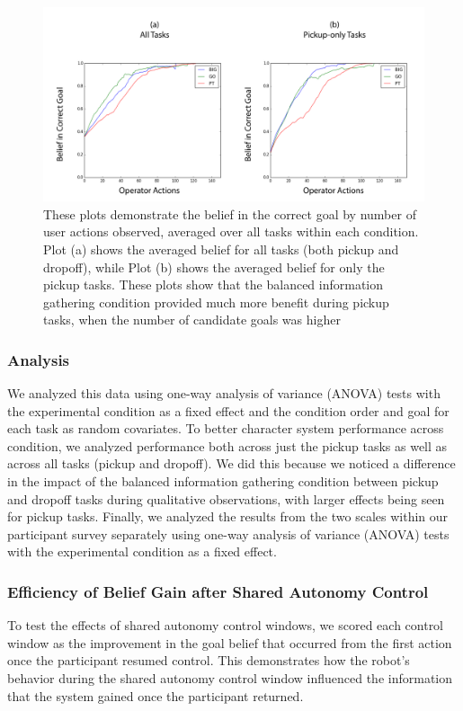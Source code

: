 \documentclass[conference]{IEEEtran}
\begin{document}
\begin{figure}
\includegraphics[width=\columnwidth]{figures/Graphs.pdf}
\caption{These plots demonstrate the belief in the correct goal by number of user actions observed, averaged over all tasks within each condition. Plot (a) shows the averaged belief for all tasks (both pickup and dropoff), while Plot (b) shows the averaged belief for only the pickup tasks. These plots show that the balanced information gathering condition provided much more benefit during pickup tasks, when the number of candidate goals was higher}
\label{belief_graphs}
\end{figure}

\subsubsection{Analysis}

We analyzed this data using one-way analysis of variance (ANOVA) tests with the experimental condition as a fixed effect and the condition order and goal for each task as random covariates. To better character system performance across condition, we analyzed performance both across just the pickup tasks as well as across all tasks (pickup and dropoff). We did this because we noticed a difference in the impact of the balanced information gathering condition between pickup and dropoff tasks during qualitative observations, with larger effects being seen for pickup tasks. Finally, we analyzed the results from the two scales within our participant survey separately using one-way analysis of variance (ANOVA) tests with the experimental condition as a fixed effect.

\subsubsection{Efficiency of Belief Gain after Shared Autonomy Control}
To test the effects of shared autonomy control windows, we scored each control window as the improvement in the goal belief that occurred from the first action once the participant resumed control. This demonstrates how the robot's behavior during the shared autonomy control window influenced the information that the system gained once the participant returned.
\end{document}
